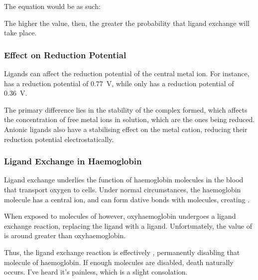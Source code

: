 				The \Kstab{} equation would be as such:


				The higher the \Kstab{} value, then, the greater the probability that ligand exchange will take place.




			\subsubsection{Effect on Reduction Potential}

				Ligands can affect the reduction potential of the central metal ion. For instance,  has a reduction
				potential of \SI[retain-explicit-plus]{+0.77}{\volt}, while  only has a reduction potential of
				\SI[retain-explicit-plus]{+0.36}{\volt}.

				The primary difference lies in the stability of the complex formed, which affects the concentration of free metal ions in
				solution, which are the ones being reduced. Anionic ligands also have a stabilising effect on the metal cation, reducing their
				reduction potential electrostatically.



			\subsubsection{Ligand Exchange in Haemoglobin}

				Ligand exchange underlies the function of haemoglobin molecules in the blood that transport oxygen to cells. Under normal
				circumstances, the haemoglobin molecule has a central  ion, and can  form dative bonds with 
				molecules, creating .

				When exposed to molecules of  however, oxyhaemoglobin undergoes a ligand exchange reaction, replacing the  ligand
				with a  ligand. Unfortunately, the \Kstab{} value of  is around  greater
				than oxyhaemoglobin.

				Thus, the ligand exchange reaction is effectively , permanently disabling that molecule of haemoglobin.
				If enough molecules are disabled, death naturally occurs. I've heard it's painless, which is a slight consolation.

